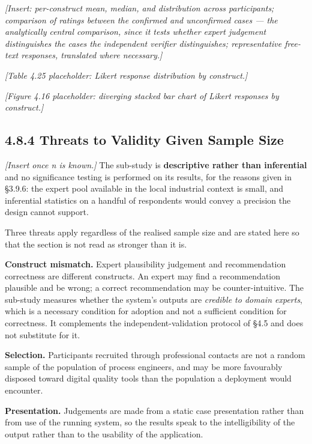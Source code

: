 \emph{{[}Insert: per-construct mean, median, and distribution across participants; comparison of ratings between the confirmed and unconfirmed cases --- the analytically central comparison, since it tests whether expert judgement distinguishes the cases the independent verifier distinguishes; representative free-text responses, translated where necessary.{]}}

\emph{{[}Table 4.25 placeholder: Likert response distribution by construct.{]}}

\emph{{[}Figure 4.16 placeholder: diverging stacked bar chart of Likert responses by construct.{]}}

\hypertarget{threats-to-validity-given-sample-size}{%
\subsection{4.8.4 Threats to Validity Given Sample Size}\label{threats-to-validity-given-sample-size}}

\emph{{[}Insert once n is known.{]}} The sub-study is \textbf{descriptive rather than inferential} and no significance testing is performed on its results, for the reasons given in §3.9.6: the expert pool available in the local industrial context is small, and inferential statistics on a handful of respondents would convey a precision the design cannot support.

Three threats apply regardless of the realised sample size and are stated here so that the section is not read as stronger than it is.

\textbf{Construct mismatch.} Expert plausibility judgement and recommendation correctness are different constructs. An expert may find a recommendation plausible and be wrong; a correct recommendation may be counter-intuitive. The sub-study measures whether the system's outputs are \emph{credible to domain experts}, which is a necessary condition for adoption and not a sufficient condition for correctness. It complements the independent-validation protocol of §4.5 and does not substitute for it.

\textbf{Selection.} Participants recruited through professional contacts are not a random sample of the population of process engineers, and may be more favourably disposed toward digital quality tools than the population a deployment would encounter.

\textbf{Presentation.} Judgements are made from a static case presentation rather than from use of the running system, so the results speak to the intelligibility of the output rather than to the usability of the application.

